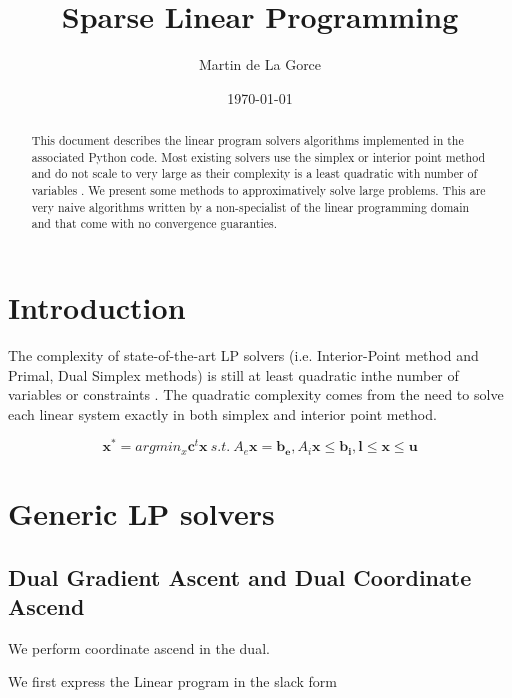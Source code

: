 \documentclass[11pt]{article}
\begin{document}
\title{Sparse Linear Programming}
\author{Martin de La Gorce}
\date{\today}
\maketitle

\begin{abstract}
    This document describes the linear program solvers algorithms implemented in the associated Python code. Most existing solvers use the simplex or interior point method and do not scale to very large as their complexity is a least quadratic with number of variables \cite{NocedalWright2006}. We present some methods to approximatively solve large problems. This are very naive algorithms written by a non-specialist of the linear programming domain and that come with no convergence guaranties.
\end{abstract}


\tableofcontents

\section{Introduction}

The complexity of state-of-the-art LP
solvers (i.e. Interior-Point method and Primal, Dual Simplex methods) is still at least quadratic inthe number of variables or constraints \cite{NocedalWright2006}.
The quadratic complexity comes from the need to solve each linear system exactly in both simplex and interior point method.

\begin{equation}
\mathbf{x}^*=argmin_x \mathbf{c}^t\mathbf{x} ~  s.t.~  A_e\mathbf{x}=\mathbf{b_e},A_i\mathbf{x}\leq\mathbf{ b_i}, \mathbf{l}\leq \mathbf{x}\leq \mathbf{u} 
\end{equation}


\section{Generic LP solvers}
\subsection{Dual Gradient Ascent and Dual Coordinate Ascend}

We perform coordinate ascend in the dual. 

We first express the Linear program in the slack form
\end{document}

